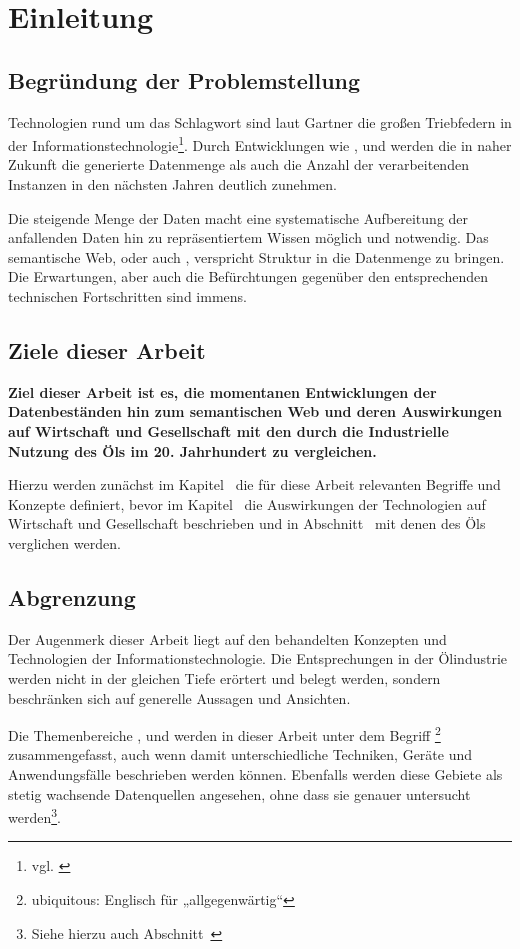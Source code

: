 \section{Einleitung}
\label{sec:einleitung}

\subsection{Begründung der Problemstellung}

Technologien rund um das Schlagwort  sind laut Gartner die großen Triebfedern in der Informationstechnologie\footnote{vgl. \cite{gartner2014}}. Durch Entwicklungen wie ,  und  werden die in naher Zukunft die generierte Datenmenge als auch die Anzahl der verarbeitenden Instanzen in den nächsten Jahren deutlich zunehmen.

Die steigende Menge der Daten macht eine systematische Aufbereitung der anfallenden Daten hin zu repräsentiertem Wissen möglich und notwendig. Das semantische Web, oder auch , verspricht Struktur in die Datenmenge zu bringen. Die Erwartungen, aber auch die Befürchtungen gegenüber den entsprechenden technischen Fortschritten sind immens.

\subsection{Ziele dieser Arbeit}

\textbf{Ziel dieser Arbeit ist es, die momentanen Entwicklungen der Datenbeständen hin zum semantischen Web und deren Auswirkungen auf Wirtschaft und Gesellschaft mit den durch die Industrielle Nutzung des Öls im 20. Jahrhundert zu vergleichen.}

Hierzu werden zunächst im Kapitel~ die für diese Arbeit relevanten Begriffe und Konzepte definiert, bevor im Kapitel~ die Auswirkungen der Technologien auf Wirtschaft und Gesellschaft beschrieben und in Abschnitt~ mit denen des Öls verglichen werden.

\subsection{Abgrenzung}

Der Augenmerk dieser Arbeit liegt auf den behandelten Konzepten und Technologien der Informationstechnologie. Die Entsprechungen in der Ölindustrie werden nicht in der gleichen Tiefe erörtert und belegt werden, sondern beschränken sich auf generelle Aussagen und Ansichten.

Die Themenbereiche ,  und  werden in dieser Arbeit unter dem Begriff \footnote{ubiquitous: Englisch für „allgegenwärtig“} zusammengefasst, auch wenn damit unterschiedliche Techniken, Geräte und Anwendungsfälle beschrieben werden können. Ebenfalls werden diese Gebiete als stetig wachsende Datenquellen angesehen, ohne dass sie genauer untersucht werden\footnote{Siehe hierzu auch Abschnitt~}.